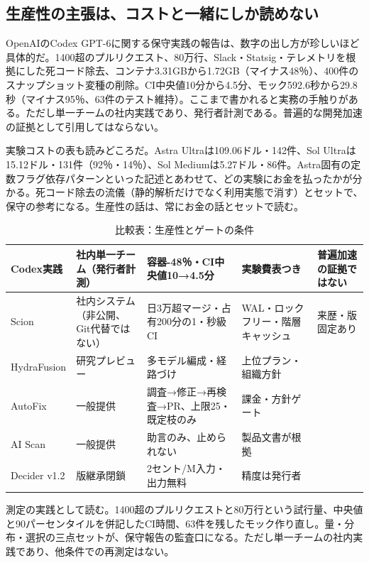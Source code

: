 \documentclass[lualatex,a4paper,10pt]{jlreq}
\begin{document}
\subsection*{生産性の主張は、コストと一緒にしか読めない}

OpenAIのCodex GPT-6に関する保守実践の報告は、数字の出し方が珍しいほど具体的だ。1400超のプルリクエスト、80万行、Slack・Statsig・テレメトリを根拠にした死コード除去、コンテナ3.31GBから1.72GB（マイナス48％）、400件のスナップショット変種の削除。CI中央値10分から4.5分、モック592.6秒から29.8秒（マイナス95％、63件のテスト維持）。ここまで書かれると実務の手触りがある。ただし単一チームの社内実践であり、発行者計測である。普遍的な開発加速の証拠として引用してはならない。
\cite{B31}


実験コストの表も読みどころだ。Astra Ultraは109.06ドル・142件、Sol Ultraは15.12ドル・131件（92％・14％）、Sol Mediumは5.27ドル・86件。Astra固有の定数フラグ依存パターンといった記述とあわせて、どの実験にお金を払ったかが分かる。死コード除去の流儀（静的解析だけでなく利用実態で消す）とセットで、保守の参考になる。生産性の話は、常にお金の話とセットで読む。
\cite{B31}


\begin{table}[htbp]\centering\footnotesize
\caption{比較表：生産性とゲートの条件}
\begin{tabularx}{0.96\linewidth}{@{}lXXXX@{}}
\toprule
Codex実践 & 社内単一チーム（発行者計測） & 容器-48％・CI中央値10→4.5分 & 実験費表つき & 普遍加速の証拠ではない \cite{B31} \\
\midrule
Scion & 社内システム（非公開、Git代替ではない） & 日3万超マージ・占有200分の1・秒級CI & WAL・ロックフリー・階層キャッシュ & 来歴・版固定あり \cite{B32,B75} \\
\midrule
HydraFusion & 研究プレビュー & 多モデル編成・経路づけ & 上位プラン・組織方針 \cite{B33,B76} \\
\midrule
AutoFix & 一般提供 & 調査→修正→再検査→PR、上限25・既定枝のみ & 課金・方針ゲート \cite{B34,B77} \\
\midrule
AI Scan & 一般提供 & 助言のみ、止められない & 製品文書が根拠 \cite{B35,B78} \\
\midrule
Decider v1.2 & 版継承閉鎖 & 2セント/M入力・出力無料 & 精度は発行者 \cite{B37,B36,B38} \\
\bottomrule
\end{tabularx}
\end{table}

測定の実践として読む。1400超のプルリクエストと80万行という試行量、中央値と90パーセンタイルを併記したCI時間、63件を残したモック作り直し。量・分布・選択の三点セットが、保守報告の監査口になる。ただし単一チームの社内実践であり、他条件での再測定はない。
\cite{B31}
\end{document}
